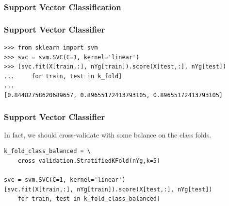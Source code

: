\documentclass[10pt, colorlinks]{beamer}
\begin{document}
\subsubsection{Support Vector Classification}
\begin{frame}[fragile]\frametitle{Support Vector Classifier}
\small
\begin{verbatim}
>>> from sklearn import svm
>>> svc = svm.SVC(C=1, kernel='linear')
>>> [svc.fit(X[train,:], nYg[train]).score(X[test,:], nYg[test]) 
...     for train, test in k_fold]
... 
[0.84482758620689657, 0.89655172413793105, 0.89655172413793105]
\end{verbatim}

\end{frame}

\begin{frame}[fragile]\frametitle{Support Vector Classifier}
In fact, we should cross-validate with some balance on the class folds.
\begin{verbatim}
k_fold_class_balanced = \
    cross_validation.StratifiedKFold(nYg,k=5)

svc = svm.SVC(C=1, kernel='linear')
[svc.fit(X[train,:], nYg[train]).score(X[test,:], nYg[test]) 
    for train, test in k_fold_class_balanced]
\end{verbatim}

\end{frame}
\end{document}
